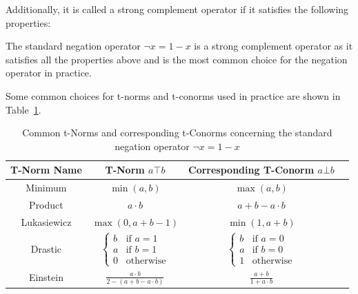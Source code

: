 Additionally, it is called a strong complement operator if it satisfies the following properties:


The standard negation operator $\neg x = 1 - x$ is a strong complement operator as it satisfies all the properties above and is the most common choice for the negation operator in practice.

Some common choices for t-norms and t-conorms used in practice are shown in Table~\ref{tab:tnorms}.





\begin{table}[H]
      \centering
      {\renewcommand{\arraystretch}{1.2}
            \begin{tabular}{|c|c|c|c|}
                  \hline
                  T-Norm Name & T-Norm   $a \top b$                                                                              & Corresponding T-Conorm      $a \bot b$                                                           \\
                  \hline
                  Minimum     & $\min(a, b)$                                                                                     & $\max(a, b)$                                                                                     \\
                  Product     & $a \cdot b$                                                                                      & $a + b - a \cdot b$                                                                              \\
                  Lukasiewicz & $\max(0, a + b - 1)$                                                                             & $\min(1, a + b)$                                                                                 \\
                  Drastic     & $\begin{cases} b & \text{if } a = 1 \\ a & \text{if } b = 1 \\ 0 & \text{otherwise} \end{cases}$ & $\begin{cases} b & \text{if } a = 0 \\ a & \text{if } b = 0 \\ 1 & \text{otherwise} \end{cases}$ \\
                  Einstein    & $\frac{a \cdot b}{2 - (a + b - a \cdot b)}$                                                      & $\frac{a + b}{1 + a \cdot b}$                                                                    \\

                  \hline
            \end{tabular}
      }
      \caption{Common t-Norms and corresponding t-Conorms concerning the standard negation operator $\neg x = 1 - x$}
      \label{tab:tnorms}
\end{table}

